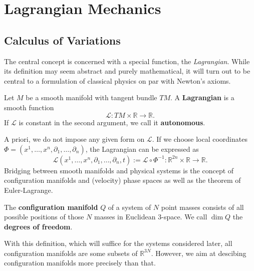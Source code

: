 \section{Lagrangian Mechanics}
\subsection{Calculus of Variations}
The central concept is concerned with a special function, the \emph{Lagrangian}. While its definition may seem abstract and purely mathematical, it will turn out to be central to a formulation of classical physics on par with Newton's axioms.
\begin{definition}[Lagrangian]
    Let $M$ be a smooth manifold with tangent bundle $TM$. A \textbf{Lagrangian} is a smooth function \[
    \mathcal{L}: TM \times \mathbb{R} \to \mathbb{R}
    .\] If $\mathcal{L}$ is constant in the second argument, we call it \textbf{autonomous}. 
\end{definition}
A priori, we do not impose any given form on $\mathcal{L}$. If we choose local coordinates $\Phi=(x^1, \dots, x^n, \partial_1, \dots, \partial_n)$, the Lagrangian can be expressed as \[
    \mathcal{L}(x^1, \dots, x^n, \partial_1, \dots, \partial_n,t):= \mathcal{L} \circ \Phi^{-1}: \mathbb{R}^{2n} \times \mathbb{R} \to \mathbb{R}
.\] 
Bridging between smooth manifolds and physical systems is the concept of configuration manifolds and (velocity) phase spaces as well as the theorem of Euler-Lagrange.
\begin{definition}
    The \textbf{configuration manifold} $Q$ of a system of $N$ point masses consists of all possible positions of those $N$ masses in Euclidean $3$-space. We call $\dim Q$ the \textbf{degrees of freedom}.
\end{definition}
With this definition, which will suffice for the systems considered later, all configuration manifolds are some subsets of $\mathbb{R}^{3N}$. However, we aim at descibing configuration manifolds more precisely than that.
